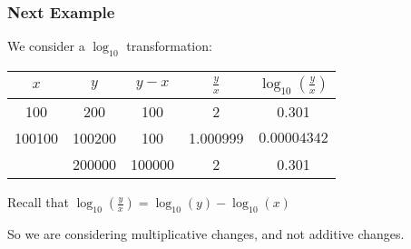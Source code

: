 \documentclass[slides]{beamer}
\newcommand{\blue}[1]{\textcolor{blue2}{#1}}
\begin{document}
\begin{frame}[fragile]
\frametitle{Next Example}
We consider a $\log_{10}$ transformation:

\begin{center}
  \begin{tabular}{cc|c|cc}
    $x$ & $y$ & $y-x$ & $\frac{y}{x}$ & $\log_{10}\left(\frac{y}{x}\right)$\\ 
\hline
    100 & 200 & 100 & 2 & 0.301\\ 
    100100 & 100200 & 100 & 1.000999 & $0.00004342$\\ 
    \pause 100000 & 200000 & 100000 & 2& \blue{0.301} \\ 
  \end{tabular}
\end{center}

\pause Recall that $\log_{10}\left(\frac{y}{x}\right) = \log_{10}(y) - \log_{10}(x)$

\vspace{0.5cm}

\pause So we are considering \blue{multiplicative} changes, and not \blue{additive} changes.


\end{frame}
\end{document}
